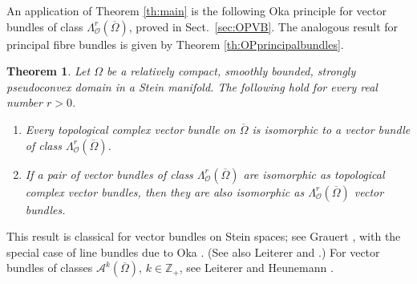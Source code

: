 \documentclass[11pt]{amsart}
\numberwithin{equation}{section}
\newtheorem{theorem}{Theorem}[section]
\theoremstyle{definition}
\newcommand\Ascr{\mathscr{A}}
\newcommand\Oscr{\mathscr{O}}
\newcommand\Z{\mathbb{Z}}
\begin{document}
An application of Theorem \ref{th:main} is 
the following Oka principle for vector bundles of class 
$\Lambda^r_\Oscr(\overline\Omega)$, proved in Sect.\ \ref{sec:OPVB}. 
The analogous result for principal fibre bundles 
is given by Theorem \ref{th:OPprincipalbundles}. 

\begin{theorem}\label{th:OPVB}
Let $\Omega$ be a relatively compact, smoothly bounded,
strongly pseudoconvex domain in a Stein manifold.
The following hold for every real number $r>0$.
\begin{enumerate}[\rm (i)]
\item Every topological complex vector bundle on $\overline\Omega$
is isomorphic to a vector bundle of class 
$\Lambda^r_\Oscr(\overline\Omega)$.
\item If a pair of vector bundles 
of class $\Lambda^r_\Oscr(\overline\Omega)$ are isomorphic as
topological complex vector bundles, then they are also
isomorphic as $\Lambda^r_\Oscr(\overline\Omega)$ vector bundles.
\end{enumerate}
\end{theorem}

This result is classical for vector bundles on Stein spaces;
see Grauert \cite{Grauert1958MA}, with the special case 
of line bundles due to Oka \cite{Oka1939}. 
(See also Leiterer \cite{Leiterer1990} and 
\cite[Theorem 5.3.1]{Forstneric2017E}.) For vector bundles
of classes $\Ascr^k(\overline\Omega)$, $k\in \Z_+$,  
see Leiterer \cite{Leiterer1976I,Leiterer1976II}
and Heunemann \cite[Theorem 2]{Heunemann1986I}.
\end{document}
